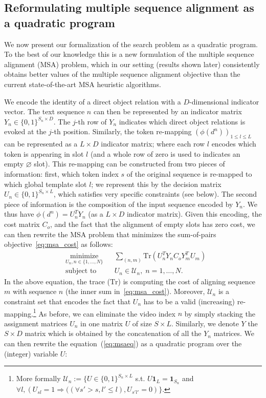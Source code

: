 \documentclass[10pt,twocolumn,letterpaper]{article}
\newcommand{\Ctext}{C_o} %
\begin{document}
\subsection{Reformulating multiple sequence alignment as a quadratic program}
\label{subsec:details_msa}

We now present our formalization of the search problem as a quadratic program.
To the best of our knowledge this is a new formulation of the multiple sequence alignment (MSA) problem, 
which in our setting (results shown later) consistently obtains better values of the multiple sequence alignment objective than the current
state-of-the-art MSA heuristic algorithms.
 
We encode the identity of a direct object relation with a $D$-dimensional
indicator vector.
The text sequence $n$ can then be represented by an indicator matrix $Y_n \in \{0,1\}^{S_n\times D}$.
The $j$-th row of $Y_n$ indicates which direct object relations is evoked at the $j$-th position.
Similarly, the token re-mapping  $(\phi(d^n))_{1\leq l\leq L}$ can
be represented as a $L \times D$ indicator matrix; where 
each row $l$ encodes which token is appearing in slot $l$ (and
a whole row of zero is used to indicates an empty $\varnothing$ slot).
This re-mapping can be constructed from two 
pieces of information: first, which token index $s$ of the original sequence
is re-mapped to which global template slot $l$; 
we represent this by the decision matrix  $U_n\in\{0,1\}^{S_n\times L}$,
which satisfies very specific constraints (see below).
The second piece of information is the composition 
of the input sequence encoded by $Y_n$.
We thus have $\phi(d^n) = U_n^T Y_n$ (as a $L \times D$ indicator
matrix). Given this encoding, the cost matrix $\Ctext$, and the fact
that the alignment of empty slots has zero cost, we
can then rewrite the MSA problem that minimizes
the sum-of-pairs objective~\eqref{eq:msa_cost}
as follows:
\begin{equation}
\begin{aligned}
& \underset{U_n, n\in\{1,\ldots,N\}}{\text{minimize}}
& & \sum_{(n,m)} \mathrm{Tr}(U_n^TY_n \Ctext Y_m^TU_m) \\
& \text{subject to}
& & U_n \in \mathcal{U}_n, \; n = 1, \ldots, N.
\end{aligned}
\label{eq:msaeq}
\end{equation}
In the above equation, the trace ($\mathrm{Tr}$) is computing the cost of aligning sequence $m$ with sequence $n$
(the inner sum in~\eqref{eq:msa_cost}).
Moreover, $\mathcal{U}_n$ is a constraint set that encodes the fact that $U_n$ has to be a valid (increasing) re-mapping.\footnote{More formally  $\mathcal{U}_n :=\{U\in\{0,1\}^{S_n \times L}$ s.t.  $U\textbf{1}_L=\textbf{1}_{S_n}$ and $\forall l, \left( U_{sl}=1 \Rightarrow ((\forall s'>s,l'\leq l),  U_{s'l'}=0 \right)\}$.}
As before, we can eliminate the video index $n$ by simply stacking the assignment matrices $U_n$ in one matrix $U$ of size $S\times L$.
Similarly, we denote $Y$ the $S\times D$ matrix which is obtained by the concatenation of all the $Y_n$ matrices. 
We can then rewrite the equation~(\ref{eq:msaeq}) as a quadratic program over the (integer) variable $U$:
\end{document}
